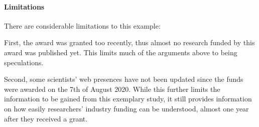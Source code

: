 \paragraph{Limitations}
There are considerable limitations to this example:

First, the award was granted too recently, thus almost no research funded by this award was published yet. 
This limits much of the arguments above to being speculations.

Second, some scientists' web presences have not been updated since the funds were awarded on the 7th of August 2020.
While this further limits the information to be gained from this exemplary study, it still provides information on how easily researchers' industry funding can be understood, almost one year after they received a grant.